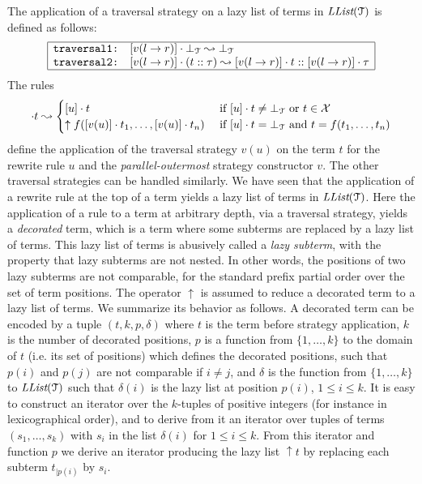 \documentclass[submission,copyright,creativecommons]{eptcs}
\newcommand \rrule[2]{#1\rightarrow #2}
\newcommand \up {\uparrow}
\newcommand \varset{\ensuremath{\mathcal{X}}}
\newcommand \llist[1]{\ensuremath{\textit{LList}(#1)}}
\numberwithin{subcase}{case}
\begin{document}
The application of a traversal strategy on a lazy list of terms in
$\llist{\EuScript{T}}$ is defined as follows:
\begin{align*}
\begin{array}{|r  l|}
\hline
 \texttt{traversal1:}
    & [v(\rrule{l}{r})]\cdot \bot_{\EuScript{T}} \leadsto
       \bot_{\EuScript{T}} \\
 \texttt{traversal2:}
    & [v(\rrule{l}{r})]\cdot(t :: \tau) \leadsto 
       [v(\rrule{l}{r})]\cdot t :: [v(\rrule{l}{r})]\cdot \tau\\
\hline       
\end{array}       
\end{align*}
 The rules
\begin{align*}
[v(u)]\cdot t\leadsto 
\begin{cases} 
[u]\cdot t 
  & \textrm{ if } [u]\cdot t \neq \bot_{\EuScript{T}} 
     \textrm{ or } t \in \varset     \\ 
  \up f([v(u)]\cdot t_1,\ldots,[v(u)]\cdot t_n)
  & \textrm{ if } [u]\cdot t = \bot_{\EuScript{T}} 
        \textrm{ and }  t=f(t_1,\ldots,t_n)   
\end{cases}
\end{align*}
define the application of the traversal strategy $v(u)$ on the term $t$ for the
rewrite rule $u$ and the \textit{parallel-outermost} strategy constructor $v$. 
The other traversal strategies can be handled similarly. We have seen that the
application of a rewrite rule at the top of a term yields a lazy list of terms in
$\llist{\EuScript{T}}$. Here the application of a rule to a term at arbitrary
depth, via a traversal strategy, yields a \emph{decorated} term, which is a term
where some subterms are replaced by a lazy list of terms. This lazy list of
terms is abusively called a \emph{lazy subterm}, with the property that lazy
subterms are not nested. In other words, the positions of two lazy subterms are not comparable, for the
standard prefix partial order over the set of term positions. The operator $\up$
is assumed to reduce a decorated term to a lazy list of terms. We
summarize its behavior as follows. A decorated term can be encoded by a
tuple $(t,k,p,\delta)$ where $t$ is the term before strategy application, $k$ is the number of
decorated positions, $p$ is a function from $\{1, \ldots, k\}$ to the domain of
$t$ (i.e. its set of positions) which defines the decorated positions, such that
$p(i)$ and $p(j)$ are not comparable if $i \neq j$, and $\delta$ is the function
from $\{1, \ldots, k\}$ to $\llist{\EuScript{T}}$ such that $\delta(i)$ is the
lazy list at position $p(i)$, $1 \leq i \leq k$. It is easy to construct an
iterator over the $k$-tuples of positive integers (for instance in
lexicographical order), and to derive from it an iterator over tuples of terms
$(s_1, \ldots, s_k)$ with $s_i$ in the list $\delta(i)$ for $1 \leq i \leq k$.
From this iterator and function $p$ we derive an iterator producing the lazy
list $\up t$ by replacing each subterm $t_{|p(i)}$ by $s_i$.
\end{document}
